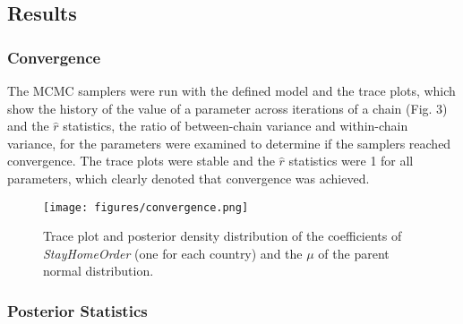 \documentclass{article}
\begin{document}
\subsection{Results}

\subsubsection{Convergence}
The MCMC samplers were run with the defined model and the trace plots, which show the history of the value of a parameter across iterations of a chain (Fig. 3) and the $\hat{r}$ statistics, the ratio of between-chain variance and within-chain variance, for the parameters were examined to determine if the samplers reached convergence. The trace plots were stable and the $\hat{r}$ statistics were 1 for all parameters, which clearly denoted that convergence was achieved.

\begin{figure}[H]
    \centering
    \texttt{[image: figures/convergence.png]}%
    \caption{Trace plot and posterior density distribution of the coefficients of \textit{StayHomeOrder} (one for each country) and the $\mu$ of the parent normal distribution.}
    \label{fig:heatmap}
\end{figure}

\subsubsection{Posterior Statistics}
\end{document}

